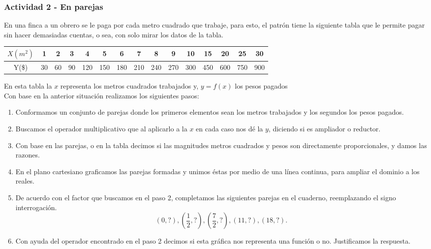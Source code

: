 \documentclass[10pt]{article}
\begin{document}
\subsubsection*{Actividad 2 - En parejas}
En una finca a un obrero se le paga por cada metro cuadrado que trabaje, para esto, el patrón tiene la siguiente tabla que le permite pagar sin hacer demasiadas cuentas, o sea, con solo mirar los datos de la tabla.
\begin{center}
\begin{tabular}{|c|c|c|c|c|c|c|c|c|c|c|c|c|c|c|}
\hline 
$X(m^{2})$ & 1 & 2 & 3 & 4 & 5 & 6 & 7 & 8 & 9 & 10 & 15 & 20 & 25 & 30 \\ 
\hline 
Y(\$) & 30 & 60 & 90 & 120 & 150 & 180 & 210 & 240 & 270 & 300 & 450 & 600 & 750 & 900 \\ 
\hline 
\end{tabular} 
\end{center}
En esta tabla la $x$ representa los metros cuadrados trabajados y, \; $y=f(x)$ los pesos pagados\\

Con base en la anterior situación realizamos los siguientes pasos:
\begin{enumerate}
\item Conformamos un conjunto de parejas donde los primeros elementos sean los metros trabajados y los segundos los pesos pagados.
\item Buscamos el operador multiplicativo que al aplicarlo a la $x$ en cada caso nos dé la $y$, diciendo si es ampliador o reductor.
\item Con base en las parejas, o en la tabla decimos si las magnitudes metros cuadrados y pesos son directamente proporcionales, y damos las razones.
\item En el plano cartesiano graficamos las parejas formadas y unimos éstas por medio de una línea continua, para ampliar el dominio a los reales.
\item De acuerdo con el factor que buscamos en el paso 2, completamos las siguientes parejas en el cuaderno, reemplazando el signo interrogación.
\[(0,?),\left(\frac{1}{2},?\right),\left(\frac{7}{2},?\right),(11,?),(18,?).\]
\item Con ayuda del operador encontrado en el paso 2 decimos si esta gráfica nos representa una función o no. Justificamos la respuesta.
\end{enumerate}
\end{document}
